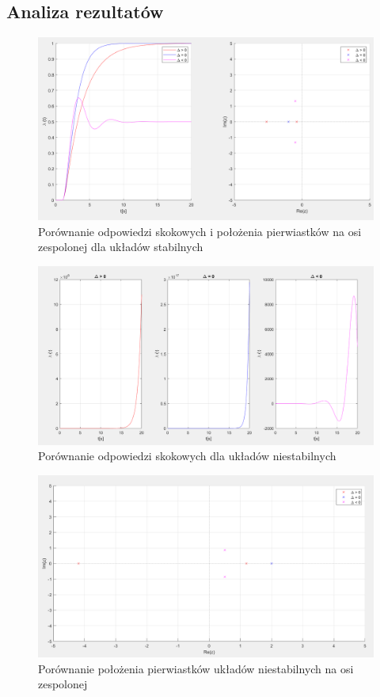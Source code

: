 \documentclass[a4paper]{article}
\begin{document}
        \subsection{Analiza rezultatów}
            \begin{figure}[H]
                \centering
                \includegraphics[scale=0.5]{porownianie_odpowiedzi.png}
                \caption{Porównanie odpowiedzi skokowych i położenia pierwiastków na osi zespolonej dla układów stabilnych}
            \end{figure}
            \begin{figure}[H]
                \centering
                \includegraphics[scale=0.5]{niestabilny_skok.png}
                \caption{Porównanie odpowiedzi skokowych dla układów niestabilnych}
            \end{figure}
            \begin{figure}[H]
                \centering
                \includegraphics[scale=0.5]{niestabilny_pierwiastki.png}
                \caption{Porównanie położenia pierwiastków układów niestabilnych na osi zespolonej}
            \end{figure}
\end{document}
